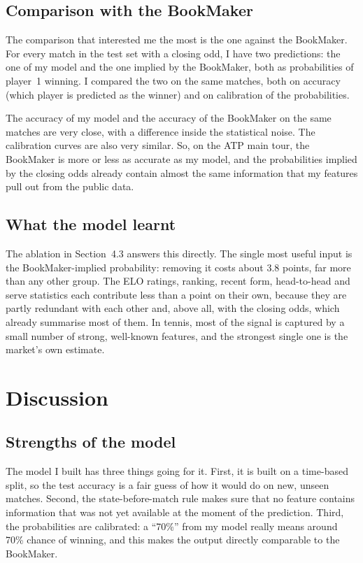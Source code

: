 \documentclass[10pt,twocolumn]{article}
\begin{document}
\subsection{Comparison with the BookMaker}
The comparison that interested me the most is the one against the
BookMaker. For every match in the test set with a closing odd, I have
two predictions: the one of my model and the one implied by the
BookMaker, both as probabilities of player~1 winning. I compared the
two on the same matches, both on accuracy (which player is predicted
as the winner) and on calibration of the probabilities.

The accuracy of my model and the accuracy of the BookMaker on the
same matches are very close, with a difference inside the statistical
noise. The calibration curves are also very similar. So, on the ATP
main tour, the BookMaker is more or less as accurate as my model, and
the probabilities implied by the closing odds already contain almost
the same information that my features pull out from the public data.

\subsection{What the model learnt}
The ablation in Section~4.3 answers this directly. The single most useful
input is the BookMaker-implied probability: removing it costs about 3.8 points,
far more than any other group. The ELO ratings, ranking, recent form,
head-to-head and serve statistics each contribute less than a point on their
own, because they are partly redundant with each other and, above all, with the
closing odds, which already summarise most of them. In tennis, most of the
signal is captured by a small number of strong, well-known features, and the
strongest single one is the market's own estimate.

\section{Discussion}

\subsection{Strengths of the model}
The model I built has three things going for it. First, it is built on
a time-based split, so the test accuracy is a fair guess of how it
would do on new, unseen matches. Second, the state-before-match rule
makes sure that no feature contains information that was not yet
available at the moment of the prediction. Third, the probabilities
are calibrated: a ``70\%'' from my model really means around 70\%
chance of winning, and this makes the output directly comparable to
the BookMaker.
\end{document}
